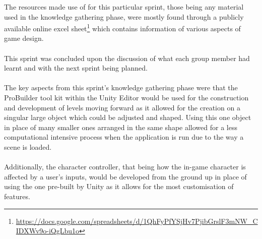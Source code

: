 \noindent The resources made use of for this particular sprint, those being any material used in the knowledge gathering phase, were mostly found through a publicly available online excel sheet\footnote{\url{https://docs.google.com/spreadsheets/d/1QhFyPfYSjHv7PjibGrslF3mNW_CIDXWv9o-iQgLbu1o}} which contains information of various aspects of game design.
\\\\
This sprint was concluded upon the discussion of what each group member had learnt and with the next sprint being planned. 
\\\\
The key aspects from this sprint's knowledge gathering phase were that the ProBuilder tool kit within the Unity Editor would be used for the construction and development of levels moving forward as it allowed for the creation on a singular large object which could be adjusted and shaped. Using this one object in place of many smaller ones arranged in the same shape allowed for a less computational intensive process when the application is run due to the way a scene is loaded. 
\\\\
Additionally, the character controller, that being how the in-game character is affected by a user's inputs, would be developed from the ground up in place of using the one pre-built by Unity as it allows for the most customisation of features. 

